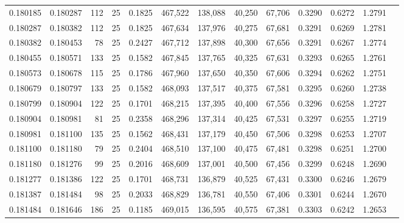 \begin{tabular}{rrrrrrrrrrrrr}
0.180185 & 0.180287 &   112 &  25 &                                     0.1825 & 467,522 & 138,088 &  40,250 &  67,706 & 0.3290 & 0.6272 & 1.2791 \\
0.180287 & 0.180382 &   112 &  25 &                                     0.1825 & 467,634 & 137,976 &  40,275 &  67,681 & 0.3291 & 0.6269 & 1.2781 \\
0.180382 & 0.180453 &    78 &  25 &                                     0.2427 & 467,712 & 137,898 &  40,300 &  67,656 & 0.3291 & 0.6267 & 1.2774 \\
0.180455 & 0.180571 &   133 &  25 &                                     0.1582 & 467,845 & 137,765 &  40,325 &  67,631 & 0.3293 & 0.6265 & 1.2761 \\
0.180573 & 0.180678 &   115 &  25 &                                     0.1786 & 467,960 & 137,650 &  40,350 &  67,606 & 0.3294 & 0.6262 & 1.2751 \\
0.180679 & 0.180797 &   133 &  25 &                                     0.1582 & 468,093 & 137,517 &  40,375 &  67,581 & 0.3295 & 0.6260 & 1.2738 \\
0.180799 & 0.180904 &   122 &  25 &                                     0.1701 & 468,215 & 137,395 &  40,400 &  67,556 & 0.3296 & 0.6258 & 1.2727 \\
0.180904 & 0.180981 &    81 &  25 &                                     0.2358 & 468,296 & 137,314 &  40,425 &  67,531 & 0.3297 & 0.6255 & 1.2719 \\
0.180981 & 0.181100 &   135 &  25 &                                     0.1562 & 468,431 & 137,179 &  40,450 &  67,506 & 0.3298 & 0.6253 & 1.2707 \\
0.181100 & 0.181180 &    79 &  25 &                                     0.2404 & 468,510 & 137,100 &  40,475 &  67,481 & 0.3298 & 0.6251 & 1.2700 \\
0.181180 & 0.181276 &    99 &  25 &                                     0.2016 & 468,609 & 137,001 &  40,500 &  67,456 & 0.3299 & 0.6248 & 1.2690 \\
0.181277 & 0.181386 &   122 &  25 &                                     0.1701 & 468,731 & 136,879 &  40,525 &  67,431 & 0.3300 & 0.6246 & 1.2679 \\
0.181387 & 0.181484 &    98 &  25 &                                     0.2033 & 468,829 & 136,781 &  40,550 &  67,406 & 0.3301 & 0.6244 & 1.2670 \\
0.181484 & 0.181646 &   186 &  25 &                                     0.1185 & 469,015 & 136,595 &  40,575 &  67,381 & 0.3303 & 0.6242 & 1.2653 \\

\end{tabular}
